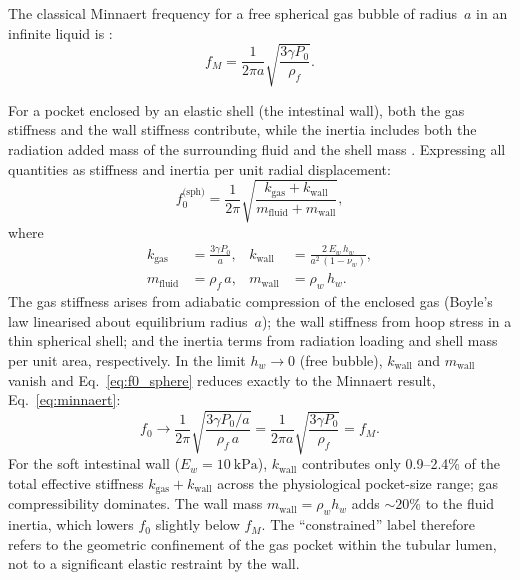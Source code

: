 \documentclass[12pt]{article}
\begin{document}
The classical Minnaert frequency for a free spherical gas bubble of
radius~$a$ in an infinite liquid is \citep{Minnaert1933}:
\begin{equation}
  f_M = \frac{1}{2\pi a}\sqrt{\frac{3\gamma P_0}{\rho_f}}.
  \label{eq:minnaert}
\end{equation}

For a pocket enclosed by an elastic shell (the intestinal wall), both the
gas stiffness and the wall stiffness contribute, while the inertia includes
both the radiation added mass of the surrounding fluid and the shell mass
\citep{Church1995,Hoff2000}.  Expressing all quantities as stiffness and
inertia per unit radial displacement:
\begin{equation}
  f_0^\text{(sph)} = \frac{1}{2\pi}\sqrt{
    \frac{k_\text{gas} + k_\text{wall}}{m_\text{fluid} + m_\text{wall}}
  },
  \label{eq:f0_sphere}
\end{equation}
where
\begin{align}
  k_\text{gas}  &= \frac{3\gamma P_0}{a}, &
  k_\text{wall} &= \frac{2\,E_w\,h_w}{a^2\,(1-\nu_w)}, \label{eq:stiffness_sphere}\\
  m_\text{fluid} &= \rho_f\,a, &
  m_\text{wall}  &= \rho_w\,h_w. \label{eq:mass_sphere}
\end{align}
The gas stiffness arises from adiabatic compression of the enclosed gas
(Boyle's law linearised about equilibrium radius~$a$); the wall stiffness
from hoop stress in a thin spherical shell; and the inertia terms from
radiation loading and shell mass per unit area, respectively.
In the limit $h_w \to 0$ (free bubble), $k_\text{wall}$ and
$m_\text{wall}$ vanish and Eq.~\eqref{eq:f0_sphere} reduces exactly to
the Minnaert result, Eq.~\eqref{eq:minnaert}:
\begin{equation*}
  f_0 \to \frac{1}{2\pi}\sqrt{\frac{3\gamma P_0 / a}{\rho_f\,a}}
       = \frac{1}{2\pi a}\sqrt{\frac{3\gamma P_0}{\rho_f}}
       = f_M.
\end{equation*}
For the soft intestinal wall ($E_w = \SI{10}{\kilo\pascal}$),
$k_\text{wall}$ contributes only 0.9--2.4\% of the total effective stiffness
$k_\text{gas} + k_\text{wall}$ across the physiological pocket-size range;
gas compressibility dominates.  The wall mass $m_\text{wall} = \rho_w h_w$
adds ${\sim}20\%$ to the fluid inertia, which lowers $f_0$ slightly below
$f_M$.  The ``constrained'' label therefore refers to the geometric
confinement of the gas pocket within the tubular lumen, not to a significant
elastic restraint by the wall.
\end{document}
